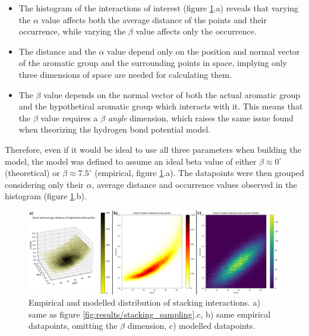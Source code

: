       \begin{itemize}
        \item The histogram of the interactions of interest (figure \ref{fig:results/stacking_modelling}.a) reveals that varying the $\alpha$ value affects both the average distance of the points and their occurrence, while varying the $\beta$ value affects only the occurrence.
        \item The distance and the $\alpha$ value depend only on the position and normal vector of the aromatic group and the surrounding points in space, implying only three dimensions of space are needed for calculating them.
        \item The $\beta$ value depends on the normal vector of both the actual aromatic group and the hypothetical aromatic group which interacts with it. This means that the $\beta$ value requires a \textit{$\beta$ angle} dimension, which raises the same issue found when theorizing the hydrogen bond potential model.
      \end{itemize}

      Therefore, even if it would be ideal to use all three parameters when building the model, the model was defined to assume an ideal beta value of either $\beta \approx 0^{\circ}$ (theoretical) or $\beta \approx 7.5^{\circ}$ (empirical, figure \ref{fig:results/stacking_modelling}.a). The datapoints were then grouped considering only their $\alpha$, average distance and occurrence values observed in the histogram (figure \ref{fig:results/stacking_modelling}.b).

      \begin{figure}[H]
        \centering
        \includegraphics[width=1\textwidth]{figures/results/stacking_modelling.png}
        \caption{\label{fig:results/stacking_modelling} Empirical and modelled distribution of stacking interactions. a) same as figure \ref{fig:results/stacking_sampling}.c, b) same empirical datapoints, omitting the $\beta$ dimension, c) modelled datapoints.}
      \end{figure}


